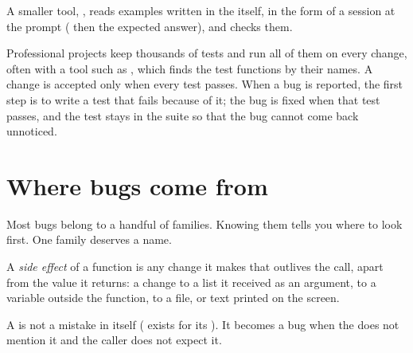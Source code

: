 A smaller tool, , reads examples written in the  itself, in the form of a session at the
prompt (\code{>>>} then the expected answer), and checks them.

\label{lst:g10:specifications-and-tests:mean}

\label{out:g10:specifications-and-tests:doctest}

\begin{inpractice}
Professional projects keep thousands of tests and run all of them on every change, often with a tool such as
, which finds the test functions by their names. A change is accepted only when every test passes.
When a bug is reported, the first step is to write a test that fails because of it; the bug is fixed when that
test passes, and the test stays in the suite so that the bug cannot come back unnoticed.
\end{inpractice}

\section{Where bugs come from}\label{sec:g10:specifications-and-tests:causes}

Most bugs belong to a handful of families. Knowing them tells you where to look first. One family deserves a
name.

\begin{definition}\label{def:g10:specifications-and-tests:side-effect}
A \emph{side effect} of a function is any change it makes that outlives the call, apart from
the value it returns: a change to a list it received as an argument, to a variable outside the function, to a
file, or text printed on the screen.
\end{definition}

A  is not a mistake in itself ( exists for its ). It becomes a bug when the
 does not mention it and the caller does not expect it.

